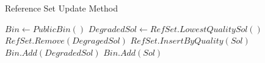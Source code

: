 \begin{algorithm}
  \caption{Reference Set Update Method}\label{alg:rs_update}
  \begin{algorithmic}[0]
    \State $Bin \gets PublicBin()$
    \State $DegradedSol \gets RefSet.LowestQualitySol()$
    \State $RefSet.Remove(DegragedSol)$
    \State $RefSet.InsertByQuality(Sol)$
    \State $Bin.Add(DegradedSol)$
    \Else
    \State $Bin.Add(Sol)$
    \EndIf \EndFor
    \EndProcedure
  \end{algorithmic}
\end{algorithm}
